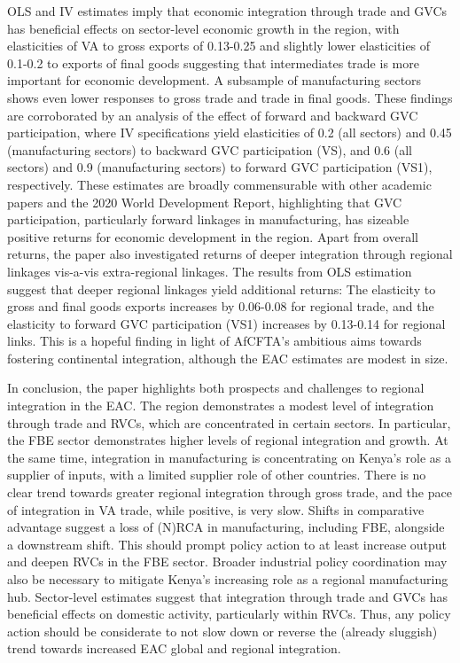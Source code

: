 \documentclass[a4paper]{article}
\begin{document}
OLS and IV estimates imply that economic integration through trade and GVCs has beneficial effects on sector-level economic growth in the region, with elasticities of VA to gross exports of 0.13-0.25 and slightly lower elasticities of 0.1-0.2 to exports of final goods suggesting that intermediates trade is more important for economic development. A subsample of manufacturing sectors shows even lower responses to gross trade and trade in final goods. These findings are corroborated by an analysis of the effect of forward and backward GVC participation, where IV specifications yield elasticities of 0.2 (all sectors) and 0.45 (manufacturing sectors) to backward GVC participation (VS), and 0.6 (all sectors) and 0.9 (manufacturing sectors) to forward GVC participation (VS1), respectively. These estimates are broadly commensurable with other academic papers and the 2020 World Development Report, highlighting that GVC participation, particularly forward linkages in manufacturing, has sizeable positive returns for economic development in the region. Apart from overall returns, the paper also investigated returns of deeper integration through regional linkages vis-a-vis extra-regional linkages. The results from OLS estimation suggest that deeper regional linkages yield additional returns: The elasticity to gross and final goods exports increases by 0.06-0.08 for regional trade, and the elasticity to forward GVC participation (VS1) increases by 0.13-0.14 for regional links. This is a hopeful finding in light of AfCFTA's ambitious aims towards fostering continental integration, although the EAC estimates are modest in size.  \newline

In conclusion, the paper highlights both prospects and challenges to regional integration in the EAC. The region demonstrates a modest level of integration through trade and RVCs, which are concentrated in certain sectors. In particular, the FBE sector demonstrates higher levels of regional integration and growth. At the same time, integration in manufacturing is concentrating on Kenya's role as a supplier of inputs, with a limited supplier role of other countries. There is no clear trend towards greater regional integration through gross trade, and the pace of integration in VA trade, while positive, is very slow. Shifts in comparative advantage suggest a loss of (N)RCA in manufacturing, including FBE, alongside a downstream shift. This should prompt policy action to at least increase output and deepen RVCs in the FBE sector. Broader industrial policy coordination may also be necessary to mitigate Kenya's increasing role as a regional manufacturing hub. Sector-level estimates suggest that integration through trade and GVCs has beneficial effects on domestic activity, particularly within RVCs. Thus, any policy action should be considerate to not slow down or reverse the (already sluggish) trend towards increased EAC global and regional integration. \newline %
\end{document}
